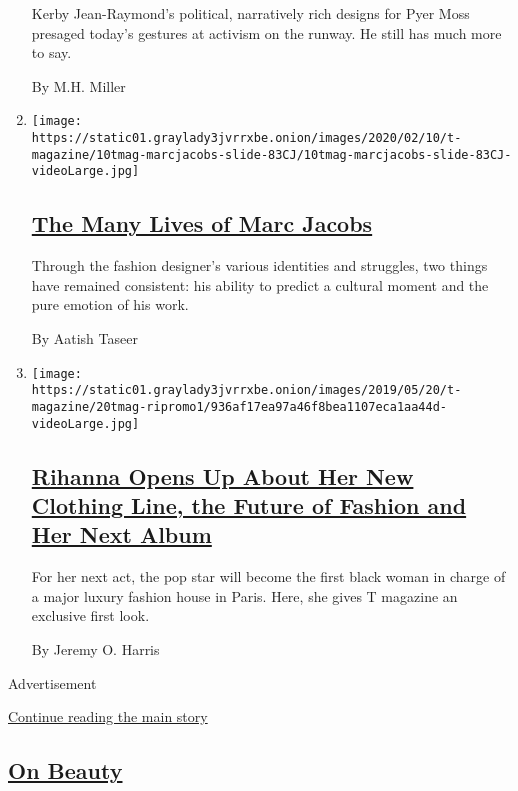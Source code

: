 \begin{enumerate}
  Kerby Jean-Raymond's political, narratively rich designs for Pyer Moss
  presaged today's gestures at activism on the runway. He still has much
  more to say.

  By M.H. Miller
\item
  \texttt{[image: https://static01.graylady3jvrrxbe.onion/images/2020/02/10/t-magazine/10tmag-marcjacobs-slide-83CJ/10tmag-marcjacobs-slide-83CJ-videoLarge.jpg]}

  \hypertarget{the-many-lives-of-marc-jacobs}{%
  \subsection{\texorpdfstring{\href{/2020/02/10/t-magazine/marc-jacobs.html}{The
  Many Lives of Marc
  Jacobs}}{The Many Lives of Marc Jacobs}}\label{the-many-lives-of-marc-jacobs}}

  Through the fashion designer's various identities and struggles, two
  things have remained consistent: his ability to predict a cultural
  moment and the pure emotion of his work.

  By Aatish Taseer
\item
  \texttt{[image: https://static01.graylady3jvrrxbe.onion/images/2019/05/20/t-magazine/20tmag-ripromo1/936af17ea97a46f8bea1107eca1aa44d-videoLarge.jpg]}

  \hypertarget{rihanna-opens-up-about-her-new-clothing-line-the-future-of-fashion-and-her-next-album}{%
  \subsection{\texorpdfstring{\href{/interactive/2019/05/20/t-magazine/rihanna-fenty-louis-vuitton.html}{Rihanna
  Opens Up About Her New Clothing Line, the Future of Fashion and Her
  Next
  Album}}{Rihanna Opens Up About Her New Clothing Line, the Future of Fashion and Her Next Album}}\label{rihanna-opens-up-about-her-new-clothing-line-the-future-of-fashion-and-her-next-album}}

  For her next act, the pop star will become the first black woman in
  charge of a major luxury fashion house in Paris. Here, she gives T
  magazine an exclusive first look.

  By Jeremy O. Harris
\end{enumerate}

Advertisement

\protect\hyperlink{after-mid1}{Continue reading the main story}

\hypertarget{on-beauty-1}{%
\subsection{\texorpdfstring{\href{/column/on-beauty}{On
Beauty}}{On Beauty}}\label{on-beauty-1}}

